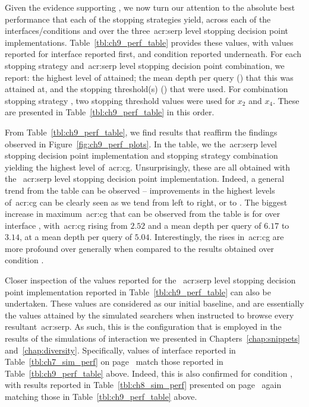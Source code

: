 Given the evidence supporting , we now turn our attention to the absolute best performance that each of the stopping strategies yield, across each of the interfaces/conditions and over the three~\gls{acr:serp} level stopping decision point implementations. Table~\ref{tbl:ch9_perf_table} provides these values, with values reported for interface  reported first, and condition  reported underneath. For each stopping strategy and~\gls{acr:serp} level stopping decision point combination, we report: the highest level of  attained; the mean depth per query () that this was attained at, and the stopping threshold(s) () that were used. For combination stopping strategy , two stopping threshold values were used for $x_2$ and $x_4$. These are presented in Table~\ref{tbl:ch9_perf_table} in this order.

From Table~\ref{tbl:ch9_perf_table}, we find results that reaffirm the findings observed in Figure~\ref{fig:ch9_perf_plots}. In the table, we  the~\gls{acr:serp} level stopping decision point implementation and stopping strategy combination yielding the highest level of~\gls{acr:cg}. Unsurprisingly, these are all obtained with the ~\gls{acr:serp} level stopping decision point implementation. Indeed, a general trend from the table can be observed -- improvements in the highest levels of~\gls{acr:cg} can be clearly seen as we tend from left to right, or  to . The biggest increase in maximum~\gls{acr:cg} that can be observed from the table is for  over interface , with~\gls{acr:cg} rising from $2.52$ and a mean depth per query of $6.17$ to $3.14$, at a mean depth per query of $5.04$. Interestingly, the rises in~\gls{acr:cg} are more profound over  generally when compared to the results obtained over condition .

Closer inspection of the values reported for the ~\gls{acr:serp} level stopping decision point implementation reported in Table~\ref{tbl:ch9_perf_table} can also be undertaken. These values are considered as our initial baseline, and are essentially the values attained by the simulated searchers when instructed to browse every resultant~\gls{acr:serp}. As such, this is the configuration that is employed in the results of the simulations of interaction we presented in Chapters~\ref{chap:snippets} and~\ref{chap:diversity}. Specifically, values of interface  reported in Table~\ref{tbl:ch7_sim_perf} on page~\pageref{tbl:ch7_sim_perf} match those reported in Table~\ref{tbl:ch9_perf_table} above. Indeed, this is also confirmed for condition , with results reported in Table~\ref{tbl:ch8_sim_perf} presented on page~\pageref{tbl:ch8_sim_perf} again matching those in Table~\ref{tbl:ch9_perf_table} above.

